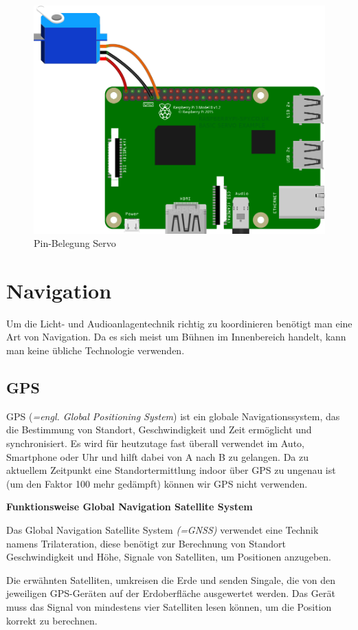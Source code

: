 \begin{figure}[H]
	\centering
	\includegraphics[width=0.7\linewidth]{images/Pin_Belegung.png}
	\caption[Pin-Belegung Servo]{Pin-Belegung Servo}
	\label{fig:PIN_Belegung}
\end{figure}
\newpage
\section{Navigation}

Um die Licht- und Audioanlagentechnik richtig zu koordinieren benötigt man eine Art von Navigation. Da es sich meist um Bühnen im Innenbereich handelt, kann man keine übliche Technologie verwenden.

\subsection{GPS}
GPS (\textit{=engl. Global Positioning System}) ist ein globale Navigationssystem, das die Bestimmung von Standort, Geschwindigkeit und Zeit ermöglicht und synchronisiert. Es wird für heutzutage fast überall verwendet im Auto, Smartphone oder Uhr und hilft dabei von A nach B zu gelangen. \parencite{GPS} Da zu aktuellem Zeitpunkt eine Standortermittlung indoor über GPS zu ungenau ist (um den Faktor 100 mehr gedämpft) können wir GPS nicht verwenden. \textcite{Indoor}

\textbf{Funktionsweise Global Navigation Satellite System}

Das Global Navigation Satellite System \textit{(=GNSS)} verwendet eine Technik namens Trilateration, diese benötigt zur Berechnung von Standort Geschwindigkeit und Höhe, Signale von Satelliten, um Positionen anzugeben. 

Die erwähnten Satelliten, umkreisen die Erde und senden Singale, die von den jeweiligen GPS-Geräten auf der Erdoberfläche ausgewertet werden. Das Gerät muss das Signal von mindestens vier Satelliten lesen können, um die Position korrekt zu berechnen. \parencite{GPS} 

